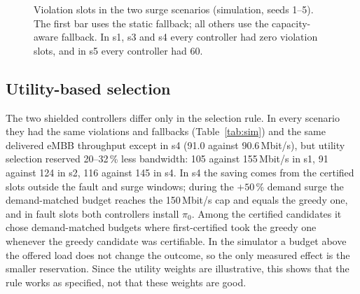 \begin{figure}[t]
\centering
{}
\caption{Violation slots in the two surge scenarios (simulation, seeds 1--5). The
first bar uses the static fallback; all others use the capacity-aware fallback.
In s1, s3 and s4 every controller had zero violation slots, and in s5 every
controller had 60.}
\label{fig:fallback}
\end{figure}

\subsection{Utility-based selection}

The two shielded controllers differ only in the selection rule. In every scenario
they had the same violations and fallbacks (Table~\ref{tab:sim}) and the same
delivered eMBB throughput except in s4 (91.0 against 90.6\,Mbit/s), but utility
selection reserved 20--32\,\% less bandwidth: 105 against 155\,Mbit/s in
s1, 91 against 124 in s2, 116 against 145 in s4. In s4 the saving comes from the
certified slots outside the fault and surge windows; during the $+50\,\%$ demand
surge the demand-matched budget reaches the 150\,Mbit/s cap and equals the greedy one,
and in fault slots both controllers install $\pi_0$. Among the certified candidates it
chose demand-matched budgets where first-certified took the greedy one whenever
the greedy candidate was certifiable. In the simulator a budget above the offered
load does not change the outcome, so the only measured effect is the smaller
reservation. Since the utility weights are illustrative, this shows that the rule
works as specified, not that these weights are good.

